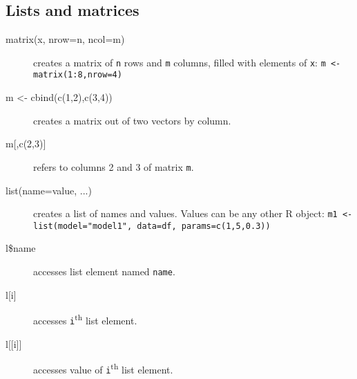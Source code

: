 \documentclass[a4paper,9pt]{extarticle}
\begin{document}
\begin{multicols}{3}
\section{Lists and matrices}
\begin{description}
\item[matrix(x, nrow=n, ncol=m)] creates a matrix of \texttt{n} rows and \texttt{m} columns, filled with elements of \texttt{x}: \texttt{m <- matrix(1:8,nrow=4)}
\item[m <- cbind(c(1,2),c(3,4))] creates a matrix out of two vectors by column.
\item[m{[,c(2,3)]}] refers to columns 2 and 3 of matrix \texttt{m}.
\item[list(name=value, ...)] creates a list of names and values. Values can be any other R object: \texttt{m1 <- list(model="model1", data=df, params=c(1,5,0.3))}
\item[l\$name] accesses list element named \texttt{name}.
\item[l{[i]}] accesses \texttt{i}\textsuperscript{th} list element.
\item[l{[[i]]}] accesses value of \texttt{i}\textsuperscript{th} list element.
\end{description}


\end{multicols}
\end{document}
